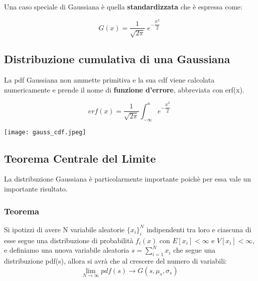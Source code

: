 \noindent Una caso speciale di Gaussiana \`{e} quella \textbf{standardizzata} che \`{e} espressa come:

\begin{equation*}
	G(x) = \dfrac{1}{\sqrt{2\pi}}\; e^{-\dfrac{x^2}{2}}
\end{equation*}

\subsection{Distribuzione cumulativa di una Gaussiana}

La pdf Gaussiana non ammette primitiva e la sua cdf viene calcolata numericamente e prende il nome di \textbf{funzione d'errore}, abbreviata con erf(x).

\vspace{0.3in}

  \begin{minipage}{0.5\textwidth}
\begin{equation*}
	erf(x) = \dfrac{1}{\sqrt{2\pi}} \int_{-\infty}^{a}{e^{-\dfrac{x^2}{2}}}
\end{equation*}
  \end{minipage}
  \begin{minipage}{.4\textwidth}
    \centering
    \texttt{[image: gauss\_cdf.jpeg]}

  \end{minipage}
\vspace{0.3in}

\subsection{Teorema Centrale del Limite} 

La distribuzione Gaussiana \`{e} particolarmente importante poich\`{e} per essa vale un importante risultato. 

\subsubsection{Teorema}

Si ipotizzi di avere N variabile aleatorie $\{x_i\}_i^N$ indipendenti tra loro e ciascuna di esse segue una distribuzione di probabilit\`{a} $f_i(x)$ con $E[x_i] < \infty$ e $V[x_i] < \infty$, e definiamo una nuova variabile aleatoria $s = \sum_{i=1}^Nx_{i}$ che segue una distribuzione pdf(s), allora si avr\`{a} che al crescere del numero di variabili:
\begin{equation*}
	\lim_{N \rightarrow \infty} pdf(s) \rightarrow G(s,\mu_s,\sigma_s)
\end{equation*}

